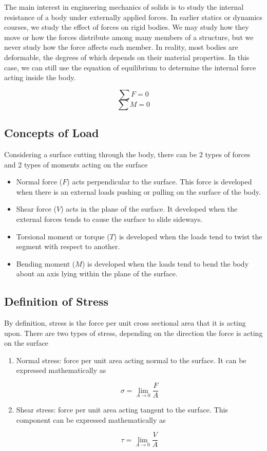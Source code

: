 \documentclass[
10pt,
a4paper,
openany,
svgnames,
]{book}
\begin{document}
The main interest in engineering mechanics of solids is to study the internal resistance of a body under externally applied forces. In earlier statics or dynamics courses, we study the effect of forces on rigid bodies. We may study how they move or how the forces distribute among many members of a structure, but we never study how the force affects each member. In reality, most bodies are deformable, the degrees of which depends on their material properties. In this case, we can still use the equation of equilibrium to determine the internal force acting inside the body.

$$ \sum F = 0 $$
$$ \sum M = 0 $$

\subsection{Concepts of Load}

Considering a surface cutting through the body, there can be 2 types of forces and 2 types of moments acting on the surface

\begin{itemize}
\item Normal force ($F$) acts perpendicular to the surface. This force is developed when there is an external loads pushing or pulling on the surface of the body.
\item Shear force ($V$) acts in the plane of the surface. It developed when the external forces tends to cause the surface to slide sideways.
\item Torsional moment or torque ($T$) is developed when the loads tend to twist the segment with respect to another.
\item Bending moment ($M$) is developed when the loads tend to bend the body about an axis lying within the plane of the surface.
\end{itemize}

\subsection{Definition of Stress}

By definition, stress is the force per unit cross sectional area that it is acting upon. There are two types of stress, depending on the direction the force is acting on the surface

\begin{enumerate}

\item Normal stress: force per unit area acting normal to the surface. It can be expressed mathematically as

\begin{equation}
\sigma  = \mathop {\lim }\limits_{A \to 0} \frac{F}{A}
\end{equation}

\item Shear stress: force per unit area acting tangent to the surface. This component can be expressed mathematically as

  \begin{equation}
    \tau  = \mathop {\lim }\limits_{A \to 0} \frac{V}{A}
  \end{equation}
\end{enumerate}
\end{document}
